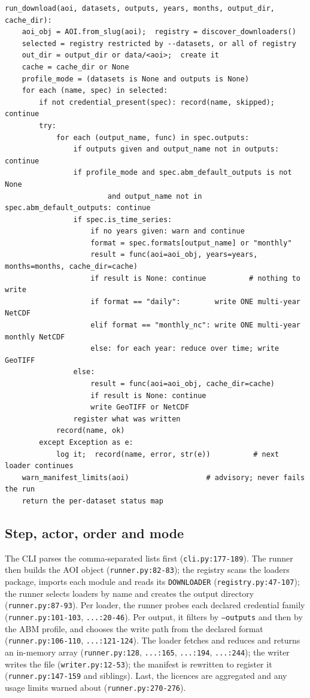 \documentclass[11pt,a4paper]{article}
\newcommand{\code}[1]{\texttt{#1}}
\begin{document}
\begin{lstlisting}[basicstyle=\small,frame=single,breaklines=true]
run_download(aoi, datasets, outputs, years, months, output_dir, cache_dir):
    aoi_obj = AOI.from_slug(aoi);  registry = discover_downloaders()
    selected = registry restricted by --datasets, or all of registry
    out_dir = output_dir or data/<aoi>;  create it
    cache = cache_dir or None
    profile_mode = (datasets is None and outputs is None)
    for each (name, spec) in selected:
        if not credential_present(spec): record(name, skipped); continue
        try:
            for each (output_name, func) in spec.outputs:
                if outputs given and output_name not in outputs: continue
                if profile_mode and spec.abm_default_outputs is not None
                        and output_name not in spec.abm_default_outputs: continue
                if spec.is_time_series:
                    if no years given: warn and continue
                    format = spec.formats[output_name] or "monthly"
                    result = func(aoi=aoi_obj, years=years, months=months, cache_dir=cache)
                    if result is None: continue          # nothing to write
                    if format == "daily":        write ONE multi-year NetCDF
                    elif format == "monthly_nc": write ONE multi-year monthly NetCDF
                    else: for each year: reduce over time; write GeoTIFF
                else:
                    result = func(aoi=aoi_obj, cache_dir=cache)
                    if result is None: continue
                    write GeoTIFF or NetCDF
                register what was written
            record(name, ok)
        except Exception as e:
            log it;  record(name, error, str(e))          # next loader continues
    warn_manifest_limits(aoi)                  # advisory; never fails the run
    return the per-dataset status map
\end{lstlisting}

\subsection{Step, actor, order and mode}

The CLI parses the comma-separated lists first
(\code{cli.py:177-189}). The runner then builds the AOI object
(\code{runner.py:82-83}); the registry scans the loaders package, imports
each module and reads its \code{DOWNLOADER}
(\code{registry.py:47-107}); the runner selects loaders by name and creates
the output directory (\code{runner.py:87-93}). Per loader, the runner
probes each declared credential family (\code{runner.py:101-103},
\code{...:20-46}). Per output, it filters by \code{--outputs} and then by
the ABM profile, and chooses the write path from the declared format
(\code{runner.py:106-110}, \code{...:121-124}). The loader fetches and
reduces and returns an in-memory array (\code{runner.py:128}, \code{...:165},
\code{...:194}, \code{...:244}); the writer writes the file
(\code{writer.py:12-53}); the manifest is rewritten to register it
(\code{runner.py:147-159} and siblings). Last, the licences are aggregated and
any usage limits warned about (\code{runner.py:270-276}).
\end{document}
